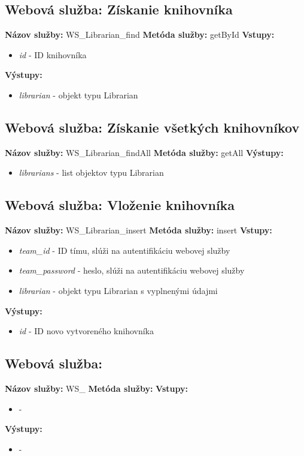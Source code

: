 \documentclass[10pt,oneside,slovak,a4paper]{article}
\begin{document}
\subsection{Webová služba: Získanie knihovníka}
\textbf{Názov služby:} WS\_Librarian\_find
\textbf{Metóda služby:} getById
\textbf{Vstupy:}
	\begin{itemize}
		\item \textit{id} - ID knihovníka
	\end{itemize}
\textbf{Výstupy:}
	\begin{itemize}
		\item \textit{librarian} - objekt typu Librarian
	\end{itemize}
	
\subsection{Webová služba: Získanie všetkých knihovníkov}
\textbf{Názov služby:} WS\_Librarian\_findAll
\textbf{Metóda služby:} getAll
\textbf{Výstupy:}
	\begin{itemize}
		\item \textit{librarians} - list objektov typu Librarian
	\end{itemize}
	
\subsection{Webová služba: Vloženie knihovníka}
\textbf{Názov služby:} WS\_Librarian\_insert
\textbf{Metóda služby:} insert
\textbf{Vstupy:}
	\begin{itemize}
		\item \textit{team\_id} - ID tímu, slúži na autentifikáciu webovej služby
		\item \textit{team\_password} - heslo, slúži na autentifikáciu webovej služby
		\item \textit{librarian} - objekt typu Librarian s vyplnenými údajmi
	\end{itemize}
\textbf{Výstupy:}
	\begin{itemize}
		\item \textit{id} - ID novo vytvoreného knihovníka
	\end{itemize}
	
\subsection{Webová služba: }
\textbf{Názov služby:} WS\_
\textbf{Metóda služby:} 
\textbf{Vstupy:}
	\begin{itemize}
		\item \textit{} - 
	\end{itemize}
\textbf{Výstupy:}
	\begin{itemize}
		\item \textit{} - 
	\end{itemize}
	
\end{document}
